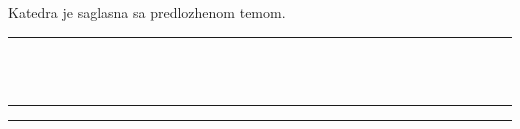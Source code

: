 \documentclass[a4paper]{article}
\begin{document}
\vspace{1cm}


\begin{flushleft}
Katedra  je saglasna sa predlozhenom temom.
\vspace{-3mm}
\hspace*{13mm} \rule[2.3cm]{9.5cm}{.05mm}\\
\vspace{-1cm}
\makebox[6.5cm][c]{} \hfill \makebox[6.5cm][c]{}\\
\rule[4mm]{6.5cm}{.05mm} \hfill \rule[4mm]{6.5cm}{.05mm}\\
\vspace{-5mm}
 \hfill {}
\end{flushleft}
\end{document}
